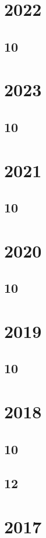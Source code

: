 \documentclass[11pt]{book}
\begin{document}
\section{2022}
\subsection{10}

\section{2023}
\subsection{10}

\section{2021}
\subsection{10}

\section{2020}
\subsection{10}

\section{2019}
\subsection{10}

\section{2018}
\subsection{10}

\subsection{12}

\section{2017}
\end{document}

